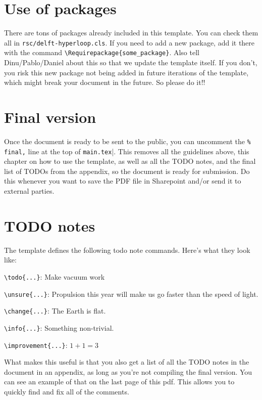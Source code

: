\section*{Use of packages}

There are tons of packages already included in this template. You can check them all in \verb|rsc/delft-hyperloop.cls|. If you need to add a new package, add it there with the command \verb|\Requirepackage{some_package}|. Also tell Dinu/Pablo/Daniel about this so that we update the template itself. If you don't, you risk this new package not being added in future iterations of the template, which might break your document in the future. So please do it!!

\section*{Final version}

Once the document is ready to be sent to the public, you can uncomment the \verb|% final,| line at the top of \verb|main.tex||. This removes all the guidelines above, this chapter on how to use the template, as well as all the TODO notes, and the final list of TODOs from the appendix, so the document is ready for submission. Do this whenever you want to save the PDF file in Sharepoint and/or send it to external parties.


\section*{TODO notes}

The template defines the following todo note commands. Here's what they look like:

\vspace{5em}

\verb|\todo{...}|: Make vacuum work 

\vspace{5em}

\verb|\unsure{...}|: Propulsion this year will make us go faster than the speed of light. 

\vspace{5em}

\verb|\change{...}|: The Earth is flat. 

\vspace{5em}

\verb|\info{...}|: Something non-trivial. 

\vspace{5em}

\verb|\improvement{...}|: $1+1=3$

\vspace{5em}

What makes this useful is that you also get a list of all the TODO notes in the document in an appendix, as long as you're not compiling the final version. You can see an example of that on the last page of this pdf. This allows you to quickly find and fix all of the comments.